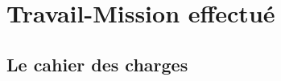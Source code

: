 \documentclass[a4paper, 11pt, french]{report}
\begin{document}
                                                                                                                                                                                                                                             \chapter{Travail-Mission
                                                                                                                                                                                                                                             effectué}
                                                                                                                                                                                                                                                \section{Le
                                                                                                                                                                                                                                                cahier
                                                                                                                                                                                                                                                des
                                                                                                                                                                                                                                                charges}
\end{document}
